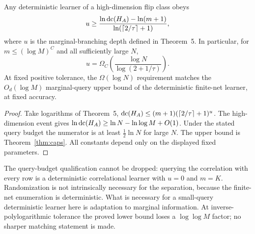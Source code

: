 \begin{theorem}\label{thm:adapt}
Any deterministic learner of a high-dimension flip class obeys
\[
 u\ge\frac{\ln\operatorname{dc}(H_A)-\ln(m+1)}
 {\ln(\lceil2/\tau\rceil+1)},
\]
where $u$ is the marginal-branching depth defined in Theorem~5. In particular, for $m\le(\log M)^C$ and all sufficiently large $N$,
\[
 u=\Omega_C\!\left(\frac{\log N}{\log(2+1/\tau)}\right).
\]
At fixed positive tolerance, the $\Omega(\log N)$ requirement matches the $O_d(\log M)$ marginal-query upper bound of the deterministic finite-net learner, at fixed accuracy.
\end{theorem}
\begin{proof}
Take logarithms of Theorem~5, $\operatorname{dc}(H_A)\le(m+1)(\lceil2/\tau\rceil+1)^u$. The high-dimension event gives $\ln\operatorname{dc}(H_A)\ge\ln N-\ln\log M+O(1)$. Under the stated query budget the numerator is at least $\tfrac12\ln N$ for large $N$. The upper bound is Theorem~\ref{thm:caps}. All constants depend only on the displayed fixed parameters.
\end{proof}

The query-budget qualification cannot be dropped: querying the correlation with every row is a deterministic correlational learner with $u=0$ and $m=K$. Randomization is not intrinsically necessary for the separation, because the finite-net enumeration is deterministic. What is necessary for a small-query deterministic learner here is adaptation to marginal information. At inverse-polylogarithmic tolerance the proved lower bound loses a $\log\log M$ factor; no sharper matching statement is made.
